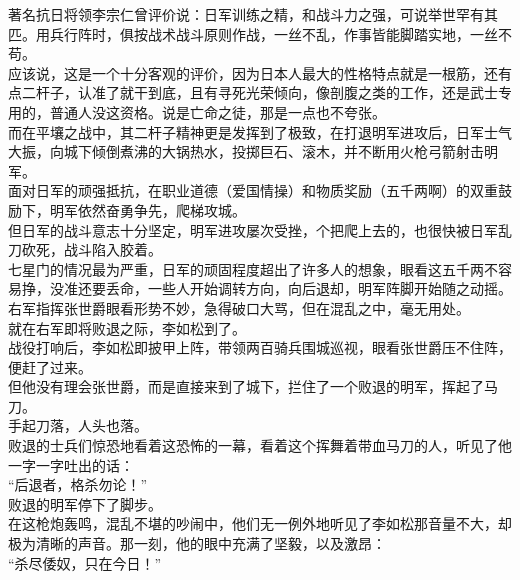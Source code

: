 \begin{multicols}{\theparacolNo}
著名抗日将领李宗仁曾评价说：日军训练之精，和战斗力之强，可说举世罕有其匹。用兵行阵时，俱按战术战斗原则作战，一丝不乱，作事皆能脚踏实地，一丝不苟。\\

应该说，这是一个十分客观的评价，因为日本人最大的性格特点就是一根筋，还有点二杆子，认准了就干到底，且有寻死光荣倾向，像剖腹之类的工作，还是武士专用的，普通人没这资格。说是亡命之徒，那是一点也不夸张。\\

而在平壤之战中，其二杆子精神更是发挥到了极致，在打退明军进攻后，日军士气大振，向城下倾倒煮沸的大锅热水，投掷巨石、滚木，并不断用火枪弓箭射击明军。\\

面对日军的顽强抵抗，在职业道德（爱国情操）和物质奖励（五千两啊）的双重鼓励下，明军依然奋勇争先，爬梯攻城。\\

但日军的战斗意志十分坚定，明军进攻屡次受挫，个把爬上去的，也很快被日军乱刀砍死，战斗陷入胶着。\\

七星门的情况最为严重，日军的顽固程度超出了许多人的想象，眼看这五千两不容易挣，没准还要丢命，一些人开始调转方向，向后退却，明军阵脚开始随之动摇。右军指挥张世爵眼看形势不妙，急得破口大骂，但在混乱之中，毫无用处。\\

就在右军即将败退之际，李如松到了。\\

战役打响后，李如松即披甲上阵，带领两百骑兵围城巡视，眼看张世爵压不住阵，便赶了过来。\\

但他没有理会张世爵，而是直接来到了城下，拦住了一个败退的明军，挥起了马刀。\\

手起刀落，人头也落。\\

败退的士兵们惊恐地看着这恐怖的一幕，看着这个挥舞着带血马刀的人，听见了他一字一字吐出的话：\\

“后退者，格杀勿论！”\\

败退的明军停下了脚步。\\

在这枪炮轰鸣，混乱不堪的吵闹中，他们无一例外地听见了李如松那音量不大，却极为清晰的声音。那一刻，他的眼中充满了坚毅，以及激昂：\\

“杀尽倭奴，只在今日！”\\


\end{multicols}
